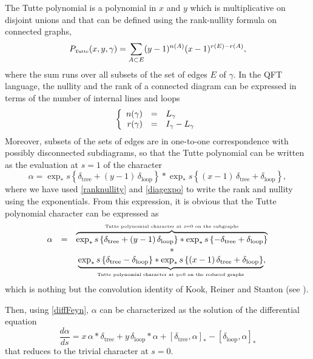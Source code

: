 \documentclass[12pt,here,feynmf]{article}
\begin{document}
The Tutte polynomial  is a polynomial in $x$ and $y$ which is multiplicative on disjoint unions and that can be defined using the rank-nullity formula on connected graphs, 
\begin{equation}
P_{\mbox{\tiny Tutte}}(x,y,\gamma)=\sum_{A\subset E}(y-1)^{n(A)}(x-1)^{r(E)-r(A)},
\end{equation}
where the sum runs over all subsets of the set of edges $E$ of $\gamma$. In the QFT language, the nullity  and the rank of a connected diagram can be expressed in terms of the number of internal lines and loops
\begin{equation}
\left\{
\begin{array}{rcl}
n(\gamma)&=&L_{\gamma}\cr
r(\gamma)&=&I_{\gamma}-L_{\gamma}
\end{array}
\label{ranknullity}
\right.
\end{equation}
Moreover, subsets of the sets of edges are in one-to-one correspondence with possibly disconnected subdiagrams, so that the Tutte polynomial can be written as the evaluation at $s=1$ of the character
\begin{equation}
\alpha=\exp_{\ast}s\left\{\delta_{\mathrm{tree}}+(y-1)\,\delta_{\mathrm{loop}}\right\}\ast
\exp_{\ast}s\left\{(x-1)\,\delta_{\mathrm{tree}}+\delta_{\mathrm{loop}}\right\},
\label{tutteprod}
\end{equation}
where we have used \eqref{ranknullity} and \eqref{diagexpo} to write the rank and nullity using the exponentials. From this expression, it is obvious that the Tutte polynomial character can be expressed as
\begin{equation}
\begin{array}{lcc}
\alpha&=&\overbrace{\exp_{\ast}s\left\{\delta_{\mathrm{tree}}+(y-1)\,\delta_{\mathrm{loop}}\right\}\ast
\exp_{\ast}s\left\{-\delta_{\mathrm{tree}}+\delta_{\mathrm{loop}}\right\}}^{\mbox{\tiny Tutte polynomial character at {\it x}=0 on the subgraphs}}\cr
&&\ast\cr
&&
\underbrace{\exp_{\ast}s\left\{\delta_{\mathrm{tree}}-\delta_{\mathrm{loop}}\right\}\ast
\exp_{\ast}s\left\{(x-1)\,\delta_{\mathrm{tree}}+\delta_{\mathrm{loop}}\right\}}_{\mbox{\tiny Tutte polynomial character at {\it y}=0 on the reduced graphs}},
\end{array}
\end{equation}
which is nothing but the convolution identity of Kook, Reiner and Stanton (see \cite{KRS}).

Then, using \eqref{diffFeyn}, $\alpha$ can be characterized as the solution of the differential equation
\begin{equation}
\frac{d\alpha}{ds}
=x\,\alpha\ast\delta_{\mathrm{tree}}
+y\,\delta_{\mathrm{loop}}\ast\alpha
+\left[\delta_{\mathrm{tree}},\alpha\right]_{\ast}
-\left[\delta_{\mathrm{loop}},\alpha\right]_{\ast}
\label{difftutte}
\end{equation}
that reduces to the trivial character at $s=0$. 
\end{document}
